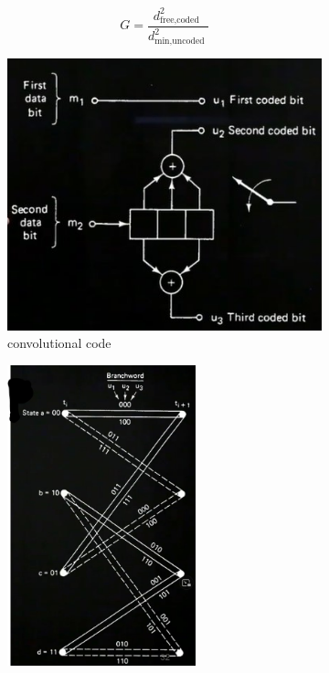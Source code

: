 $$
G=\frac{d_{\text {free,coded }}^2}{d_{\text {min,uncoded }}^2}
$$
\begin{figure}[hbt!]
    \begin{subfigure}[t]{0.49\linewidth}
        \includegraphics[width=1\textwidth]{images/trellis/trellis_example1.jpg}
        \caption{convolutional code}\label{subfig:convolutional_code}
    \end{subfigure}
    \hfil
    \begin{subfigure}[t]{0.49\linewidth}
        \centering
        \includegraphics[width=0.6\textwidth]{images/trellis/trellis_example2.jpg}

\end{subfigure}
\end{figure}

